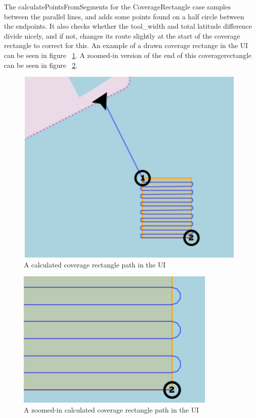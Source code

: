 The calculatePointsFromSegments for the CoverageRectangle case samples between the parallel lines, and adds some points found on a half circle between the endpoints. It also checks whether the tool_width and total latitude difference divide nicely, and if not, changes its route slightly at the start of the coverage rectangle to correct for this. An example of a drawn coverage rectange in the UI can be seen in figure ~\ref{fig:coverage_rectangle_path}. A zoomed-in version of the end of this coveragerectangle can be seen in figure ~\ref{fig:coverage_rectangle_path_zoom}.

\begin{figure}[H]
\centering
\includegraphics[max width=0.9\linewidth]{Images/Implementation/Coverage_rectangle_on_map}
\caption{A calculated coverage rectangle path in the UI}
\label{fig:coverage_rectangle_path}
\end{figure}

\begin{figure}[H]
\centering
\includegraphics[max width=0.9\linewidth]{Images/Implementation/Coverage_rectangle_on_map_zoom}
\caption{A zoomed-in calculated coverage rectangle path in the UI}
\label{fig:coverage_rectangle_path_zoom}
\end{figure}

